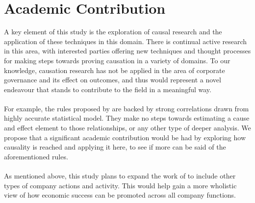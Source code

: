 \section{Academic Contribution}
{A key element of this study is the exploration of causal research and the application of these techniques in this domain. There is continual active research in this area, with interested parties offering new techniques and thought processes for making steps towards proving causation in a variety of domains. To our knowledge, causation research has not be applied in the area of corporate governance and its effect on outcomes, and thus would represent a novel endeavour that stands to contribute to the field in a meaningful way. \\\\ 
For example, the rules proposed by \cite{moldovan2015learning} are backed by strong correlations drawn from highly accurate statistical model. They make no steps towards estimating a cause and effect element to those relationships, or any other type of deeper analysis. We propose that a significant academic contribution would be had by exploring how causality is reached and applying it here, to see if more can be said of the aforementioned rules. \\\\
As mentioned above, this study plans to expand the work of \cite{moldovan2015learning} to include other types of company actions and activity. This would help gain a more wholistic view of how economic success can be promoted across all company functions. }
